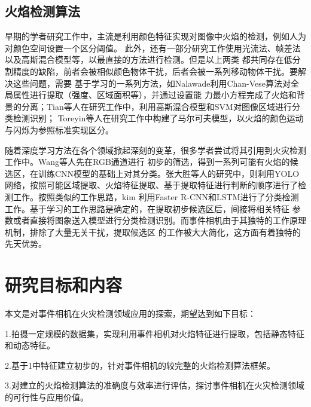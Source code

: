 \subsection{火焰检测算法}

早期的学者研究工作中，主流是利用颜色特征实现对图像中火焰的检测，例如人为对颜色空间设置一个区分阈值\cite{celik2007fire}。
此外，还有一部分研究工作使用光流法、帧差法以及高斯混合模型等，以最直接的方法进行检测。但是以上两类
都共同存在低分割精度的缺陷，前者会被相似颜色物体干扰，后者会被一系列移动物体干扰。要解决这些问题，需要
基于学习的一系列方法，如Nalawade\cite{sruthiautoadaptive}利用Chan-Vese算法对全局属性进行提取（强度、区域面积等），并通过设置能
力最小方程完成了火焰和背景的分离；Tian等人\cite{tian2011smoke}在研究工作中，利用高斯混合模型和SVM对图像区域进行分类检测识别；
Toreyin等人\cite{toreyin2007online}在研究工作中构建了马尔可夫模型，以火焰的颜色运动与闪烁为参照标准实现区分。

随着深度学习方法在各个领域掀起深刻的变革，很多学者尝试将其引用到火灾检测工作中。Wang等人\cite{wang2016fire}先在RGB通道进行
初步的筛选，得到一系列可能有火焰的候选区，在训练CNN模型的基础上对其分类。张大胜等人\cite{zds}的研究中，则利用YOLO
网络，按照可能区域提取、火焰特征提取、基于提取特征进行判断的顺序进行了检测工作。按照类似的工作思路，kim\cite{kim2019video}
利用Faster R-CNN和LSTM进行了分类检测工作。基于学习的工作思路是确定的，在提取初步候选区后，间接将相关特征
参数或者直接将图象送入模型进行分类检测识别。而事件相机由于其独特的工作原理机制，排除了大量无关干扰，提取候选区
的工作被大大简化，这方面有着独特的先天优势。

\section{研究目标和内容}

本文是对事件相机在火灾检测领域应用的探索，期望达到如下目标：

1.拍摄一定规模的数据集，实现利用事件相机对火焰特征进行提取，包括静态特征和动态特征。

2.基于1中特征建立初步的，针对事件相机的较完整的火焰检测算法框架。

3.对建立的火焰检测算法的准确度与效率进行评估，探讨事件相机在火灾检测领域的可行性与应用价值。

